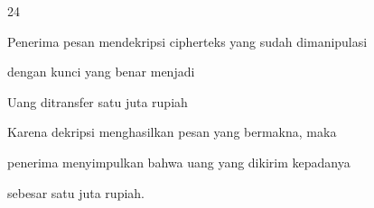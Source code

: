 \documentclass{article}
\begin{document}

24

Penerima pesan mendekripsi cipherteks yang sudah dimanipulasi 

dengan kunci yang benar menjadi

     Uang ditransfer satu juta rupiah


 Karena dekripsi menghasilkan pesan yang bermakna, maka 

penerima menyimpulkan bahwa uang yang dikirim kepadanya 

sebesar satu juta rupiah.
\end{document}
